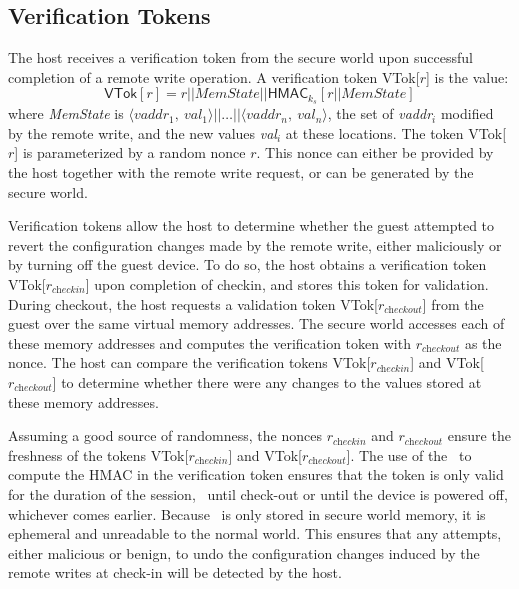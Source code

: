 \subsection{Verification Tokens}
\label{section:mechanism:tokens}

The host receives a verification token from the secure world upon successful
completion of a remote write operation. A verification token \textsf{VTok}[$r$]
is the value: 
%
$$ \textsf{VTok}[r] =
r||\textit{MemState}||\textsf{HMAC}_{k_s}[r||\textit{MemState}] $$ 
%
where \textit{MemState} is
$\langle\textit{vaddr}_1,~\textit{val}_1\rangle||\ldots||\langle\textit{vaddr}_n,~\textit{val}_n\rangle$,
the set of \textit{vaddr}$_i$ modified by the remote write, and the new values
\textit{val}$_i$ at these locations. The token \textsf{VTok}[$r$] is
parameterized by a random nonce $r$. This nonce can either be provided by the
host together with the remote write request, or can be generated by the secure
world. 

Verification tokens allow the host to determine whether the guest attempted to
revert the configuration changes made by the remote write, either maliciously
or by turning off the guest device. To do so, the host obtains a verification
token \textsf{VTok}[$r_{\textit{checkin}}$] upon completion of checkin, and
stores this token for validation. During checkout, the host requests a
validation token \textsf{VTok}[$r_\textit{checkout}$] from the guest over the
same virtual memory addresses. The secure world accesses each of these memory
addresses and computes the verification token with $r_\textit{checkout}$ as the
nonce. The host can compare the verification tokens
\textsf{VTok}[$r_{\textit{checkin}}$] and
\textsf{VTok}[$r_{\textit{checkout}}$] to determine whether there were any
changes to the values stored at these memory addresses. 

Assuming a good source of randomness, the nonces $r_\textit{checkin}$ and
$r_\textit{checkout}$ ensure the freshness of the tokens
\textsf{VTok}[$r_{\textit{checkin}}$] and
\textsf{VTok}[$r_{\textit{checkout}}$].  The use of the  \ks\ to compute the
HMAC in the verification token ensures that the token is only valid for the
duration of the session, \ie~until check-out or until the device is powered
off, whichever comes earlier. Because \ks\ is only stored in secure world
memory, it is ephemeral and unreadable to the normal world. This ensures that
any attempts, either malicious or benign, to undo the configuration changes
induced by the remote writes at check-in will be detected by the host.


